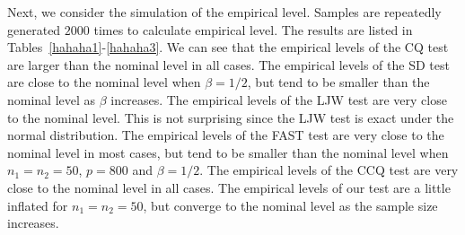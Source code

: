 \documentclass[3p]{elsarticle}
\theoremstyle{plain}
\theoremstyle{definition}
\theoremstyle{remark}
\begin{document}
Next, we consider the simulation of the empirical level. 
Samples are repeatedly generated $2000$ times to calculate empirical level.
The results are listed in Tables~\ref{hahaha1}-\ref{hahaha3}.
We can see that the empirical levels of the CQ test are larger than the nominal level in all cases.
The empirical levels of the SD test are close to the nominal level when $\beta=1/2$, but tend to be smaller than the nominal level as $\beta$ increases.
 The empirical levels of the LJW test are very close to the nominal level.
 This is not surprising since the LJW test is exact under the normal distribution.
The empirical levels of the FAST test are very close to the nominal level in most cases, but tend to be smaller than the nominal level when $n_1=n_2=50$, $p=800$ and $\beta=1/2$.
The empirical levels of the CCQ test are very close to the nominal level in all cases.
The empirical levels of our test are a little inflated for $n_1=n_2=50$, but converge to the nominal level as the sample size increases.
\end{document}
